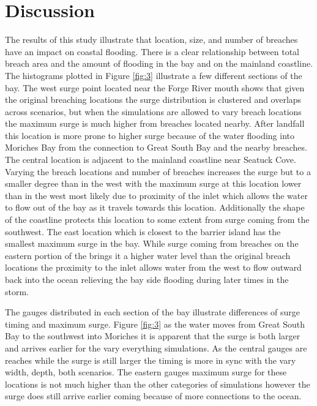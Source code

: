 \documentclass{coastal_paper}
\begin{document}
\section{Discussion}
The results of this study illustrate that location, size, and number of breaches have an impact on coastal flooding. There is a clear relationship between total breach area and the amount of flooding in the bay and on the mainland coastline. The histograms plotted in Figure \ref{fig:3} illustrate a few different sections of the bay. The west surge point located near the Forge River mouth shows that given the original breaching locations the surge distribution is clustered and overlaps across scenarios, but when the simulations are allowed to vary breach locations the maximum surge is much higher from breaches located nearby. After landfall this location is more prone to higher surge because of the water flooding into Moriches Bay from the connection to Great South Bay and the nearby breaches. %
The central location is adjacent to the mainland coastline near Seatuck Cove. Varying the breach locations and number of breaches increases the surge but to a smaller degree than in the west with the maximum surge at this location lower than in the west most likely due to proximity of the inlet which allows the water to flow out of the bay as it travels towards this location. Additionally the shape of the coastline protects this location to some extent from surge coming from the southwest. 
The east location which is closest to the barrier island has the smallest maximum surge in the bay. While surge coming from breaches on the eastern portion of the brings it a higher water level than the original breach locations the proximity to the inlet allows water from the west to flow outward back into the ocean relieving the bay side flooding during later times in the storm.

The gauges distributed in each section of the bay illustrate differences of surge timing and maximum surge. Figure \ref{fig:3} as the water moves from Great South Bay to the southwest into Moriches it is apparent that the surge is both larger and arrives earlier for the vary everything simulations. As the central gauges are reaches while the surge is still larger the timing is more in sync with the vary width, depth, both scenarios. The eastern gauges maximum surge for these locations is not much higher than the other categories of simulations however the surge does still arrive earlier coming because of more connections to the ocean.
\end{document}
